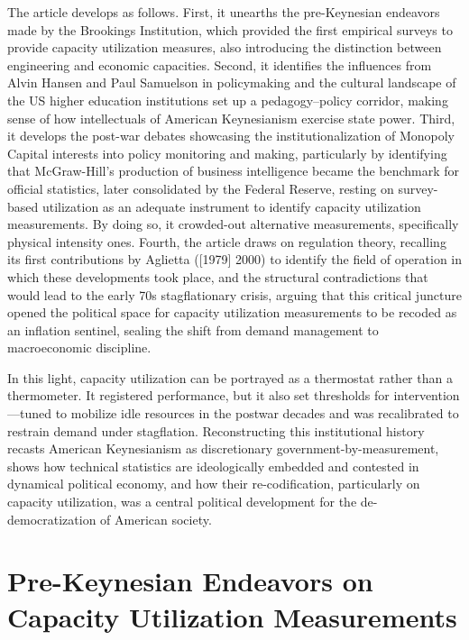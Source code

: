 \documentclass[11pt]{article}
\begin{document}
The article develops as follows. First, it unearths the pre-Keynesian endeavors made by the Brookings Institution, which provided the first empirical surveys to provide capacity utilization measures, also introducing the distinction between engineering and economic capacities. Second, it identifies the influences from Alvin Hansen and Paul Samuelson in policymaking and the cultural landscape of the US higher education institutions set up a pedagogy--policy corridor, making sense of how intellectuals of American Keynesianism exercise state power. Third, it develops the post-war debates showcasing the institutionalization of Monopoly Capital interests into policy monitoring and making, particularly by identifying that McGraw-Hill's production of business intelligence became the benchmark for official statistics, later consolidated by the Federal Reserve, resting on survey-based utilization as an adequate instrument to identify capacity utilization measurements. By doing so, it crowded-out alternative measurements, specifically physical intensity ones. Fourth, the article draws on regulation theory, recalling its first contributions by Aglietta ([1979] 2000) to identify the field of operation in which these developments took place, and the structural contradictions that would lead to the early 70s stagflationary crisis, arguing that this critical juncture opened the political space for capacity utilization measurements to be recoded as an inflation sentinel, sealing the shift from demand management to macroeconomic discipline.

In this light, capacity utilization can be portrayed as a thermostat rather than a thermometer. It registered performance, but it also set thresholds for intervention---tuned to mobilize idle resources in the postwar decades and was recalibrated to restrain demand under stagflation. Reconstructing this institutional history recasts American Keynesianism as discretionary government-by-measurement, shows how technical statistics are ideologically embedded and contested in dynamical political economy, and how their re-codification, particularly on capacity utilization, was a central political development for the de-democratization of American society.


\section{Pre-Keynesian Endeavors on Capacity Utilization Measurements}
\end{document}

